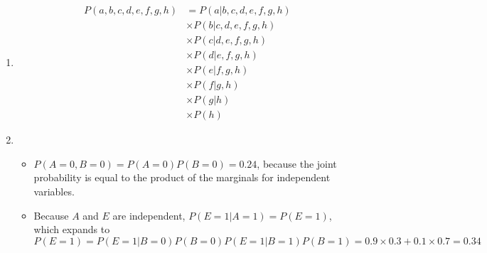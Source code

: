 \documentclass[]{article}
\begin{document}
\begin{enumerate}
\begin{enumerate}
\begin{itemize}
\end{itemize}
\item 
\begin{align}
P(a,b,c,d,e,f,g,h)&=P(a|b,c,d,e,f,g,h)\\
&\times P(b|c,d,e,f,g,h)\\
&\times P(c|d,e,f,g,h)\\
&\times P(d|e,f,g,h)\\ 
&\times P(e|f,g,h)\\
&\times P(f|g,h)\\ 
&\times P(g|h)\\
&\times P(h)
\end{align}

\item \begin{itemize}
\item $P(A=0,B=0)=P(A=0)P(B=0)=0.24$, because the joint probability is equal to the product of the marginals for independent variables.
\item Because $A$ and $E$ are independent, $P(E=1|A=1)=P(E=1)$, which expands to $P(E=1)=P(E=1|B=0)P(B=0)P(E=1|B=1)P(B=1)=0.9\times 0.3+ 0.1\times 0.7=0.34$
\end{itemize}
\end{enumerate}
\end{enumerate}
\end{document}
